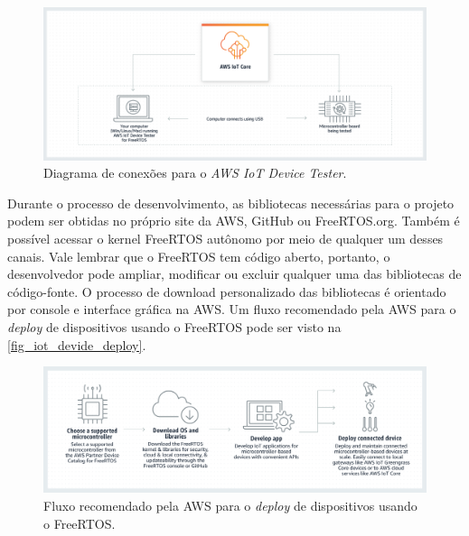 \documentclass[
    12pt,
    openright,
    twoside,
    a4paper,
    english,
    spanish,
    brazil,
    ]{abntex2}
\begin{document}
\begin{figure}[htb]
	\caption{Diagrama de conexões para o \textit{AWS IoT Device Tester}.}\label{fig_aws_iot_device_tester}
	\begin{center}
		\includegraphics[scale=0.4]{Images/aws_iot_device_tester.png}
	\end{center}
\end{figure}

Durante o processo de desenvolvimento, as bibliotecas necessárias para o projeto podem ser obtidas no próprio site da AWS, GitHub ou FreeRTOS.org. Também é possível acessar o kernel FreeRTOS autônomo por meio de qualquer um desses canais. Vale lembrar que o FreeRTOS tem código aberto, portanto, o desenvolvedor pode ampliar, modificar ou excluir qualquer uma das bibliotecas de código-fonte. O processo de download personalizado das bibliotecas é orientado por console e interface gráfica na AWS. Um fluxo recomendado pela AWS para o \textit{deploy} de dispositivos usando o FreeRTOS pode ser visto na \autoref{fig_iot_devide_deploy}.
\begin{figure}[htb]
	\caption{Fluxo recomendado pela AWS para o \textit{deploy} de dispositivos usando o FreeRTOS.}\label{fig_iot_devide_deploy}
	\begin{center}
		\includegraphics[scale=0.4]{Images/iot_device_deploy.png}
	\end{center}
\end{figure}

\end{document}
